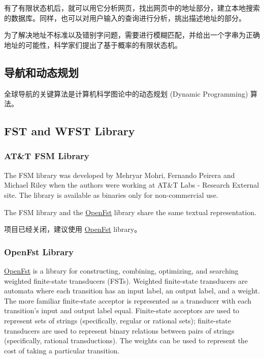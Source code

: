 \documentclass[11pt]{article}
\begin{document}
有了有限状态机后，就可以用它分析网页，找出网页中的地址部分，建立本地搜索的数据库。同样，也可以对用户输入的查询进行分析，挑出描述地址的部分。

为了解决地址不标准以及错别字问题，需要进行模糊匹配，并给出一个字串为正确地址的可能性，科学家们提出了基于概率的有限状态机。

\subsection{导航和动态规划}
\label{sec:org2e6acd7}
全球导航的关键算法是计算机科学图论中的动态规划 (Dynamic Programming) 算法。

\subsection{FST and WFST Library}
\label{sec:orgd1e2d17}

\subsubsection{AT\&T FSM Library}
\label{sec:orgb8b0292}
The FSM library was developed by Mehryar Mohri, Fernando Peirera and Michael Riley when the authors were working at AT\&T Labs - Research External site. The library is available as binaries only for non-commercial use.

The FSM library and the \href{http://www.openfst.org/twiki/bin/view/FST/WebHome}{OpenFst} library share the same textual representation.

项目已经关闭，建议使用 \href{http://www.openfst.org/twiki/bin/view/FST/WebHome}{OpenFst} library。

\subsubsection{OpenFst Library}
\label{sec:orgfacd063}
\href{http://www.openfst.org/twiki/bin/view/FST/WebHome}{OpenFst} is a library for constructing, combining, optimizing, and searching weighted finite-state transducers (FSTs). Weighted finite-state transducers are automata where each transition has an input label, an output label, and a weight. The more familiar finite-state acceptor is represented as a transducer with each transition's input and output label equal. Finite-state acceptors are used to represent sets of strings (specifically, regular or rational sets); finite-state transducers are used to represent binary relations between pairs of strings (specifically, rational transductions). The weights can be used to represent the cost of taking a particular transition.
\end{document}
